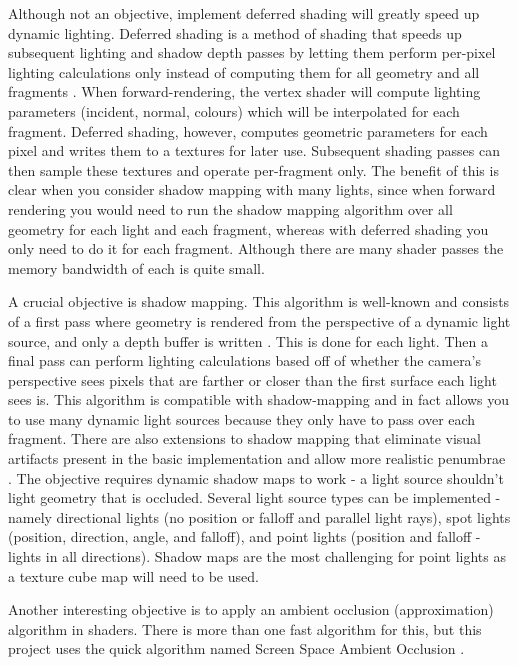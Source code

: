 \documentclass {article}
\begin{document}
\begin{description}
    Although not an objective, implement deferred shading will greatly speed up dynamic lighting. Deferred shading is a method of shading that speeds up subsequent lighting and shadow depth passes by letting them perform per-pixel lighting calculations only instead of computing them for all geometry and all fragments \cite{ferkoreal}.
    When forward-rendering, the vertex shader will compute lighting parameters (incident, normal, colours) which will be interpolated for each fragment. Deferred shading, however, computes geometric parameters for each pixel and writes them to a textures for later use. Subsequent shading passes can then sample these textures and operate per-fragment only. The benefit of this is clear when you consider shadow mapping with many lights, since when forward rendering you would need to run the shadow mapping algorithm over all geometry for each light and each fragment, whereas with deferred shading you only need to do it for each fragment. Although there are many shader passes the memory bandwidth of each is quite small.

    A crucial objective is shadow mapping. This algorithm is well-known and consists of a first pass where geometry is rendered from the perspective of a dynamic light source, and only a depth buffer is written \cite{williams1978casting}. This is done for each light. Then a final pass can perform lighting calculations based off of whether the camera's perspective sees pixels that are farther or closer than the first surface each light sees is. This algorithm is compatible with shadow-mapping and in fact allows you to use many dynamic light sources because they only have to pass over each fragment. There are also extensions to shadow mapping that eliminate visual artifacts present in the basic implementation and allow more realistic penumbrae \cite{dimitrov2007cascaded} \cite{fernando2005percentage}.
    The objective requires dynamic shadow maps to work - a light source shouldn't light geometry that is occluded. Several light source types can be implemented - namely directional lights (no position or falloff and parallel light rays), spot lights (position, direction, angle, and falloff), and point lights (position and falloff - lights in all directions). Shadow maps are the most challenging for point lights as a texture cube map will need to be used.

    Another interesting objective is to apply an ambient occlusion (approximation) algorithm in shaders. There is more than one fast algorithm for this, but this project uses the quick algorithm named Screen Space Ambient Occlusion \cite{kajalinshaderx7}\cite{mittring2007finding}.


\end{description}
\end{document}
